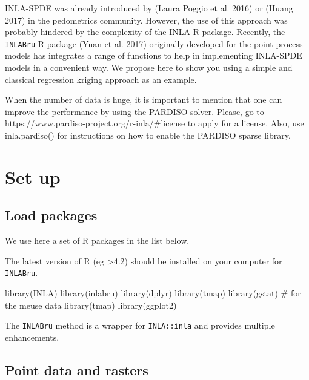 \documentclass[
  a4paper,
]{article}
\newenvironment{Shaded}{\begin{snugshade}}{\end{snugshade}}
\newcommand{\CommentTok}[1]{\textcolor[rgb]{0.37,0.37,0.37}{#1}}
\newcommand{\FunctionTok}[1]{\textcolor[rgb]{0.28,0.35,0.67}{#1}}
\newcommand{\NormalTok}[1]{\textcolor[rgb]{0.00,0.23,0.31}{#1}}
\begin{document}
INLA-SPDE was already introduced by (Laura Poggio et al. 2016) or (Huang
2017) in the pedometrics community. However, the use of this approach
was probably hindered by the complexity of the INLA R package. Recently,
the \texttt{INLABru} R package (Yuan et al. 2017) originally developed
for the point process models has integrates a range of functions to help
in implementing INLA-SPDE models in a convenient way. We propose here to
show you using a simple and classical regression kriging approach as an
example.

When the number of data is huge, it is important to mention that one can
improve the performance by using the PARDISO solver. Please, go to
https://www.pardiso-project.org/r-inla/\#license to apply for a license.
Also, use inla.pardiso() for instructions on how to enable the PARDISO
sparse library.

\hypertarget{set-up}{%
\section{Set up}\label{set-up}}

\hypertarget{load-packages}{%
\subsection{Load packages}\label{load-packages}}

We use here a set of R packages in the list below.

The latest version of R (eg \textgreater4.2) should be installed on your
computer for \texttt{INLABru}.

\begin{Shaded}
\begin{Highlighting}[]
\FunctionTok{library}\NormalTok{(INLA)}
\FunctionTok{library}\NormalTok{(inlabru)}
\FunctionTok{library}\NormalTok{(dplyr)}
\FunctionTok{library}\NormalTok{(tmap)}
\FunctionTok{library}\NormalTok{(gstat) }\CommentTok{\# for the meuse data}
\FunctionTok{library}\NormalTok{(tmap)}
\FunctionTok{library}\NormalTok{(ggplot2)}
\end{Highlighting}
\end{Shaded}

The \texttt{INLABru} method is a wrapper for \texttt{INLA::inla} and
provides multiple enhancements.

\hypertarget{point-data-and-rasters}{%
\subsection{Point data and rasters}\label{point-data-and-rasters}}
\end{document}
